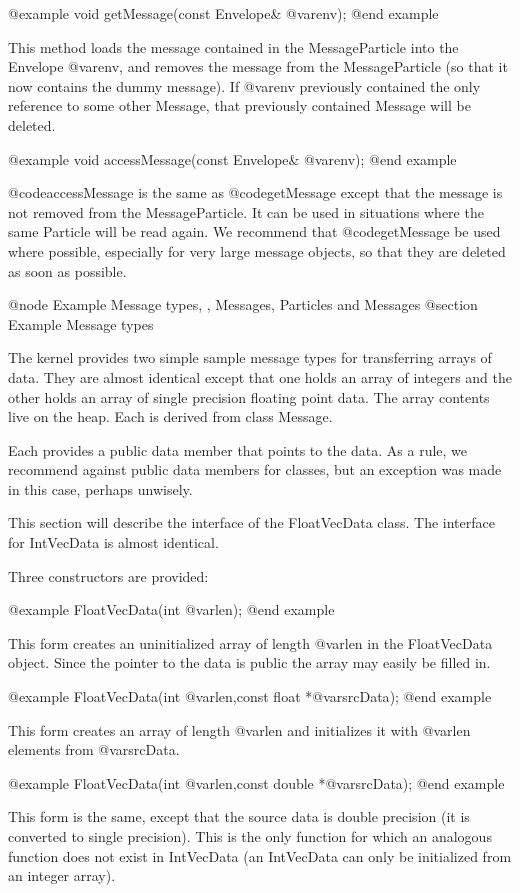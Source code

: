 @example
void getMessage(const Envelope& @var{env});
@end example

This method loads the message contained in the MessageParticle into the
Envelope @var{env}, and removes the message from the MessageParticle
(so that it now contains the dummy message).  If @var{env} previously
contained the only reference to some other Message, that previously
contained Message will be deleted.

@example
void accessMessage(const Envelope& @var{env});
@end example

@code{accessMessage} is the same as @code{getMessage} except that the
message is not removed from the MessageParticle.  It can be used in
situations where the same Particle will be read again.  We recommend
that @code{getMessage} be used where possible, especially for very
large message objects, so that they are deleted as soon as possible.

@node Example Message types,  , Messages, Particles and Messages
@section Example Message types

The kernel provides two simple sample message types for transferring
arrays of data.  They are almost identical except that one holds an
array of integers and the other holds an array of single precision
floating point data.  The array contents live on the heap.  Each is
derived from class Message.

Each provides a public data member that points to the data.  As a rule,
we recommend against public data members for classes, but an exception
was made in this case, perhaps unwisely.

This section will describe the interface of the FloatVecData class.
The interface for IntVecData is almost identical.

Three constructors are provided:

@example
FloatVecData(int @var{len});
@end example

This form creates an uninitialized array of length @var{len} in the
FloatVecData object.  Since the pointer to the data is public the
array may easily be filled in.

@example
FloatVecData(int @var{len},const float *@var{srcData});
@end example

This form creates an array of length @var{len} and initializes it with
@var{len} elements from @var{srcData}.

@example
FloatVecData(int @var{len},const double *@var{srcData});
@end example

This form is the same, except that the source data is double precision
(it is converted to single precision).  This is the only function for
which an analogous function does not exist in IntVecData (an IntVecData
can only be initialized from an integer array).

